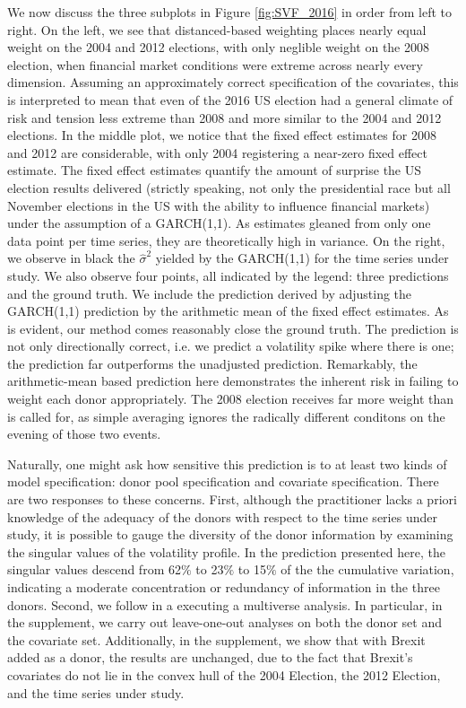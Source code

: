 \documentclass[11pt,3p,review,authoryear]{elsarticle}
\theoremstyle{definition}
\begin{document}
We now discuss the three subplots in Figure \ref{fig:SVF_2016} in order from left to right.  On the left, we see that distanced-based weighting places nearly equal weight on the 2004 and 2012 elections, with only neglible weight on the 2008 election, when financial market conditions were extreme across nearly every dimension.  Assuming an approximately correct specification of the covariates, this is interpreted to mean that even of the 2016 US election had a general climate of risk and tension less extreme than 2008 and more similar to the 2004 and 2012 elections.  In the middle plot, we notice that the fixed effect estimates for 2008 and 2012 are considerable, with only 2004 registering a near-zero fixed effect estimate.  The fixed effect estimates quantify the amount of surprise the US election results delivered (strictly speaking, not only the presidential race but all November elections in the US with the ability to influence financial markets) under the assumption of a GARCH(1,1).  As estimates gleaned from only one data point per time series, they are theoretically high in variance.  On the right, we observe in black the  $\hat\sigma^{2}$ yielded by the GARCH(1,1) for the time series under study.  We also observe four points, all indicated by the legend: three predictions and the ground truth.  We include the prediction derived by adjusting the GARCH(1,1) prediction by the arithmetic mean of the fixed effect estimates.  As is evident, our method comes reasonably close the ground truth.  The prediction is not only directionally correct, i.e. we predict a volatility spike where there is one; the prediction far outperforms the unadjusted prediction.  Remarkably, the arithmetic-mean based prediction here demonstrates the inherent risk in failing to weight each donor appropriately.  The 2008 election receives far more weight than is called for, as simple averaging ignores the radically different conditons on the evening of those two events.  

Naturally, one might ask how sensitive this prediction is to at least two kinds of model specification: donor pool specification and covariate specification.  There are two responses to these concerns.  First, although the practitioner lacks a priori knowledge of the adequacy of the donors with respect to the time series under study, it is possible to gauge the diversity of the donor information by examining the singular values of the volatility profile.  In the prediction presented here, the singular values descend from 62$\%$ to 23$\%$ to 15$\%$ of the the cumulative variation, indicating a moderate concentration or redundancy of information in the three donors.  Second, we follow \citet{steegen2016increasing} in a executing a multiverse analysis.  In particular, in the supplement, we carry out leave-one-out analyses on both the donor set and the covariate set.  Additionally, in the supplement, we show that with Brexit added as a donor, the results are unchanged, due to the fact that Brexit's covariates do not lie in the convex hull of the 2004 Election, the 2012 Election, and the time series under study.
\end{document}
